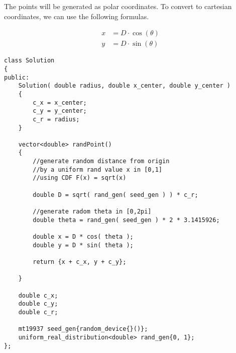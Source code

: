 The points will be generated as polar coordinates. To convert to cartesian coordinates, we can use the following formulas.

\begin{align*}
x &= D \cdot \cos(\theta) \\ y &= D \cdot \sin(\theta)
\end{align*}

\begin{lstlisting}[style=customc, caption={Inverse Transform Sampling}]
class Solution
{
public:
    Solution( double radius, double x_center, double y_center )
    {
        c_x = x_center;
        c_y = y_center;
        c_r = radius;
    }

    vector<double> randPoint()
    {
        //generate random distance from origin
        //by a uniform rand value x in [0,1]
        //using CDF F(x) = sqrt(x)

        double D = sqrt( rand_gen( seed_gen ) ) * c_r;

        //generate radom theta in [0,2pi]
        double theta = rand_gen( seed_gen ) * 2 * 3.1415926;

        double x = D * cos( theta );
        double y = D * sin( theta );

        return {x + c_x, y + c_y};

    }

    double c_x;
    double c_y;
    double c_r;

    mt19937 seed_gen{random_device{}()};
    uniform_real_distribution<double> rand_gen{0, 1};
};
\end{lstlisting}